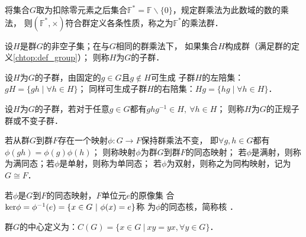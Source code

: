 \begin{example}
    将集合$G$取为扣除零元素之后集合$\mathbb{F}^*=\mathbb{F}\backslash \{0\}$，规定群乘法为此数域的数的乘法，
    则$(\mathbb{F}^*,\times)$符合群定义各条性质，称之为$\mathbb{F}^*$的{\heiti 乘法群}．
\end{example}

    
\begin{definition}
    设$H$是群$G$的非空子集；在与$G$相同的群乘法下，
    如果集合$H$构成群（满足群的定义\ref{chtop:def_group}）；
    则称$H$为$G$的{\heiti 子群}．
\end{definition}

\begin{definition}
    设$H$为$G$的{子群}，由固定的$g\in G$且$g\notin H$可生成
    子群$H$的{\heiti 左陪集}：$g H = \{g h \mid \forall  h \in H \}$；
    同样可生成子群$H$的{\heiti 右陪集}：$ Hg = \{ h g  \mid \forall  h \in H \}$．
\end{definition}

\begin{definition}\label{chtop:def_normal-subgroup}
    设$H$为$G$的子群，若对于任意$g\in G$都有$g h g^{-1} \in H, \ \forall h\in H$；
    则称$H$为$G$的{\heiti 正规子群}或{\heiti 不变子群}．
\end{definition}
    
    
\begin{definition}\label{chtop:def_tttg}
    若从群$G$到群$F$存在一个映射$\phi:G\to F$保持群乘法不变，
    即$\forall g,h\in G$都有$\phi(gh)=\phi(g)\phi(h)$；
    则称映射$\phi$为群$G$到群$F$的{\heiti 同态映射}；
    若$\phi$是满射，则称为{\heiti 满同态}；若$\phi$是单射，则称为{\heiti 单同态}；
    若$\phi$为双射，则称之为{\heiti 同构映射}，记为$G \cong F$．
\end{definition}
    
\begin{definition}\label{chtop:def_kernel}
    若$\phi$是$G$到$F$的同态映射，$F$单位元$e$的原像集
    合${\rm ker}\phi = \phi^{-1}(e)=\{x\in G \ |\ \phi(x)=e\}$称
    为$\phi$的{\heiti 同态核}，简称{\heiti 核} ．
\end{definition}

     

\begin{definition}\label{chtop:def_center}
    群$G$的{\heiti 中心}定义为：$C(G)=\{x\in G\ |\ xy=yx, \forall y\in G\}$．
\end{definition}

